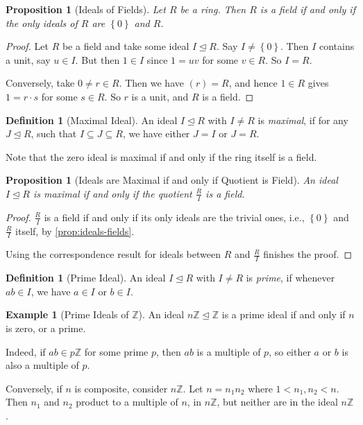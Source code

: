 \documentclass{article}
\newtheorem{proposition}[theorem]{Proposition}
\theoremstyle{definition}
\newtheorem{definition}[theorem]{Definition}
\newtheorem{example}[theorem]{Example}
\theoremstyle{remark}
\newcommand{\pqty}[1]{\left(#1\right)}
\newcommand{\Bqty}[1]{\left\{#1\right\}}
\newcommand{\flatfrac}[2]{\frac{#1}{#2}}
\newcommand{\idealsub}{\trianglelefteq}
\newcommand{\ZZ}{\mathbb{Z}}
\begin{document}
\begin{proposition}[Ideals of Fields]
    \label{prop:ideals-fields}%
    Let \(R\) be a ring. Then \(R\) is a field if and only if the only ideals of \(R\) are \(\Bqty{0}\) and \(R\).
\end{proposition}

\begin{proof}
    Let \(R\) be a field and take some ideal \(I \idealsub R\). Say \(I \neq \Bqty{0}\). Then \(I\) contains a unit, say \(u \in I\). But then \(1 \in I\) since \(1 = uv\) for some \(v \in R\). So \(I = R\).

    Conversely, take \(0 \neq r \in R\). Then we have \(\pqty{r} = R\), and hence \(1 \in R\) gives \(1 = r \cdot s\) for some \(s \in R\). So \(r\) is a unit, and \(R\) is a field.
\end{proof}

\begin{definition}[Maximal Ideal]
    \label{def:maximal-ideal}%
    An ideal \(I \idealsub R\) with \(I \neq R\) is \emph{maximal}, if for any \(J \idealsub R\), such that \(I \subseteq J \subseteq R\), we have either \(J = I\) or \(J = R\).
\end{definition}

Note that the zero ideal is maximal if and only if the ring itself is a field.

\begin{proposition}[Ideals are Maximal if and only if Quotient is Field]
    \label{prop:ideal-maximal-quotient-field}%
    An ideal \(I \idealsub R\) is maximal if and only if the quotient \(\flatfrac{R}{I}\) is a field.
\end{proposition}

\begin{proof}
    \(\flatfrac{R}{I}\) is a field if and only if its only ideals are the trivial ones, i.e., \(\Bqty{0}\) and \(\flatfrac{R}{I}\) itself, by \autoref{prop:ideals-fields}.

    Using the correspondence result for ideals between \(R\) and \(\flatfrac{R}{I}\) finishes the proof.
\end{proof}

\begin{definition}[Prime Ideal]
    \label{def:prime-ideal}%
    An ideal \(I \idealsub R\) with \(I \neq R\) is \emph{prime}, if whenever \(ab \in I\), we have \(a \in I\) or \(b \in I\).
\end{definition}

\begin{example}[Prime Ideals of \(\ZZ\)]
    \label{ex:prime-ideals-of-z}%
    An ideal \(n\ZZ \idealsub \ZZ\) is a prime ideal if and only if \(n\) is zero, or a prime.
    
    Indeed, if \(ab \in p\ZZ\) for some prime \(p\), then \(ab\) is a multiple of \(p\), so either \(a\) or \(b\) is also a multiple of \(p\).

    Conversely, if \(n\) is composite, consider \(n \ZZ\). Let \(n = n_1 n_2\) where \(1 < n_1, n_2 < n\). Then \(n_1\) and \(n_2\) product to a multiple of \(n\), in \(n \ZZ\), but neither are in the ideal \(n \ZZ\).
\end{example}
\end{document}
